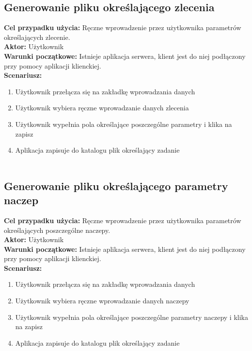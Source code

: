\subsection{Generowanie pliku określającego zlecenia}
	\textbf{Cel przypadku użycia:} Ręczne wprowadzenie przez użytkownika parametrów określających zlecenie.\\
	\textbf{Aktor:} Użytkownik\\
	\textbf{Warunki początkowe:} Istnieje aplikacja serwera, klient jest do niej podłączony przy pomocy aplikacji klienckiej.\\
	\textbf{Scenariusz:}
	\begin{enumerate}
	\item Użytkownik przełącza się na zakładkę wprowadzania danych
	\item Użytkownik wybiera ręczne wprowadzanie danych zlecenia
	\item Użytkownik wypełnia pola określające poszczególne parametry i klika na zapisz
	\item Aplikacja zapisuje do katalogu plik określający zadanie\\\\
	\end{enumerate}
	
\subsection{Generowanie pliku określającego parametry naczep}
	\textbf{Cel przypadku użycia:} Ręczne wprowadzenie przez użytkownika parametrów określających poszczególne naczepy.\\
	\textbf{Aktor:} Użytkownik\\
	\textbf{Warunki początkowe:} Istnieje aplikacja serwera, klient jest do niej podłączony przy pomocy aplikacji klienckiej.\\
	\textbf{Scenariusz:}
	\begin{enumerate}
	\item Użytkownik przełącza się na zakładkę wprowadzania danych
	\item Użytkownik wybiera ręczne wprowadzanie danych naczepy
	\item Użytkownik wypełnia pola określające poszczególne parametry naczepy i klika na zapisz
	\item Aplikacja zapisuje do katalogu plik określający zadanie\\\\
	\end{enumerate}
	
